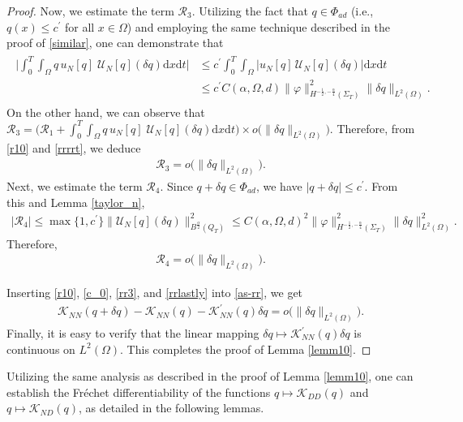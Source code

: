 \documentclass[a4paper,12pt,reqno,natbib]{amsart}
\newcommand{\dx} {\displaystyle\mathrm{d}x}
\newcommand{\dt} {\displaystyle\mathrm{d}t}
\begin{document}
\begin{proof}
Now, we estimate the term $ \mathcal{R}_3$. Utilizing the fact that $q\in\Phi_{ad}$ (i.e., $q(x)\leq c^\prime$ for all $x\in\Omega$) and employing the same technique described in the proof of \eqref{similar}, one can demonstrate that
\begin{align}
\begin{split}\label{rrrrt}
\Big|\int_0^T\int_\Omega q\, u_N[q]\; \mathcal{U}_N[q](\delta q)\dx\dt\Big|&\leq c^\prime \int_0^T\int_\Omega \Big|u_N[q]\, \mathcal{U}_N[q](\delta q)\Big|\dx\dt\\
&\leq c^\prime C(\alpha,\Omega,d)\|\varphi\|_{H^{-\frac{1}{2}, - \frac{\alpha}{4} }(\Sigma_T)}^2\|\delta q\|_{L^2(\Omega)}.
\end{split}
\end{align}
On the other hand, we can observe that $\mathcal{R}_3=\Big(\mathcal{R}_1+\displaystyle\int_0^T\int_\Omega q\,u_N[q]\; \mathcal{U}_N[q](\delta q)\dx\dt\Big)\times o\Big(\|\delta q\|_{L^2(\Omega)}\Big).$ Therefore, from \eqref{r10} and \eqref{rrrrt}, we deduce
\begin{eqnarray}\label{rr3}
     \mathcal{R}_3=o\Big(\|\delta q\|_{L^2(\Omega)}\Big).
\end{eqnarray}
Next, we estimate the term $\mathcal{R}_4.$ Since $q+\delta q\in\Phi_{ad}$, we have $|q+\delta q|\leq c^\prime.$ From this and Lemma \ref{taylor_n},
\begin{align*}
  \Big|  \mathcal{R}_4\Big|\leq \max\{1,c^\prime \} \|\mathcal{U}_{N}[q] (\delta q)\|_{B^{\frac{\alpha}{2}}(Q_T)}^2\leq C(\alpha,\Omega,d)^2\|\varphi\|_{H^{-\frac{1}{2}, - \frac{\alpha}{4} }(\Sigma_T)}^2\|\delta q\|_{L^2(\Omega)}^2.
\end{align*}
Therefore,
\begin{eqnarray}\label{rrlastly}
    \mathcal{R}_4=o\Big(\|\delta q\|_{L^2(\Omega)}\Big).
\end{eqnarray}

Inserting \eqref{r10}, \eqref{c_0}, \eqref{rr3}, and \eqref{rrlastly} into \eqref{as-rr}, we get 
\begin{align*}
    \mathcal{K}_{NN}(q+\delta q) -\mathcal{K}_{NN}(q)- \mathcal{K}_{NN}^{\prime}(q)\delta q=o\Big(\|\delta q\|_{L^2(\Omega)}\Big).
\end{align*}
Finally, it is easy to verify that the linear mapping $\delta q\longmapsto\mathcal{K}_{NN}^{\prime}(q)\delta q$ is continuous on $L^2(\Omega)$. This completes the proof of Lemma \ref{lemm10}.
\end{proof}

Utilizing the same analysis as described in the proof of Lemma \ref{lemm10}, one can establish the Fr\'echet differentiability of the functions $q\longmapsto\mathcal{K}_{DD}(q)$ and $q\longmapsto\mathcal{K}_{ND}(q)$, as detailed in the following lemmas.
\end{document}
